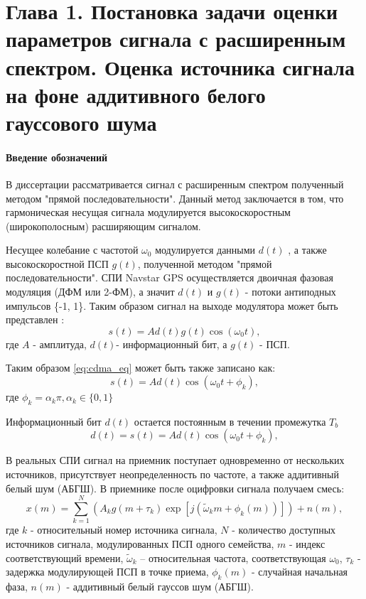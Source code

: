\section{Глава 1. Постановка задачи оценки параметров сигнала с расширенным спектром. Оценка источника сигнала на фоне аддитивного белого гауссового шума}

\paragraph{Введение обозначений}
В диссертации рассматривается сигнал с расширенным спектром полученный методом "прямой последовательности".
Данный метод заключается в том, что гармоническая несущая сигнала модулируется высокоскоростным (широкополосным)
расширяющим сигналом. 

Несущее колебание с частотой ${\omega_0}$  модулируется данными ${d(t)}$ , а также высокоскоростной ПСП ${g(t)}$, полученной методом "прямой последовательности".
СПИ Navstar GPS осуществляется двоичная фазовая модуляция (ДФМ или 2-ФМ), а значит ${d(t)}$  и ${g(t)}$  - потоки антиподных импульсов \{-1, 1\}.
Таким образом сигнал на выходе модулятора может быть представлен \cite{shahtarin_sync}:
\begin{equation}
	\label{eq:cdma_eq}
	s(t)=Ad(t)g(t)\cos{(\omega_{0}t)},
\end{equation}
где ${A}$ - амплитуда, ${d(t)}$- информационный бит, а ${g(t)}$ - ПСП.

Таким образом \ref{eq:cdma_eq} может быть также записано как:
\begin{equation}
	\label{eq:cdma_eq_phi}
	s(t)=Ad(t)\cos{(\omega_{0}t + \phi_k)},
\end{equation}
где ${\phi_k=\alpha_k \pi, \alpha_k \in \{0, 1\} }$

Информационный бит ${d(t)}$ остается постоянным в течении промежутка ${T_b}$
\begin{equation}
	\label{eq:cdma_eq_data}
	d(t) = 
	s(t)=Ad(t)\cos{(\omega_{0}t + \phi_k)},
\end{equation}

В реальных СПИ сигнал на приемник поступает одновременно от нескольких источников, присутствует неопределенность по частоте, а также аддитивный белый шум (АБГШ).
В приемнике после оцифровки сигнала получаем смесь:
\begin{equation}
	\label{eq:cdma_strip_eq}
	x(m)=\sum_{k=1}^{N}\left( A_k g(m + \tau_k)\exp{\left[j \left( \tilde{\omega}_{k}m + \phi_k(m)\right)\right]} \right) + n(m),
\end{equation}
где  ${k}$ - относительный номер источника сигнала, ${N}$ - количество доступных источников сигнала, модулированных ПСП одного семейства,
${m}$ - индекс соответствующий времени, ${\tilde{\omega}_{k}}$  – относительная частота, соответствующая ${\omega_0}$,
${\tau_k}$ - задержка модулирующей ПСП в точке приема, ${\phi_k(m)}$ - случайная начальная фаза, ${n(m)}$ - аддитивный белый гауссов шум (АБГШ). 

